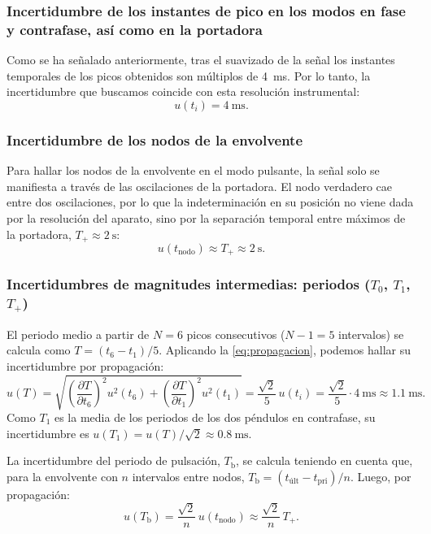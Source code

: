 \documentclass[a4paper,11pt]{amsart}
\numberwithin{equation}{section}
\newcommand{\Tb}{T_{\mathrm{b}}}              %
\newcommand{\Tp}{T_{+}}                       %
\theoremstyle{cienplano}
\theoremstyle{ciendef}
\theoremstyle{cienobs}
\begin{document}
\subsubsection{Incertidumbre de los instantes de pico en los modos en fase y contrafase, así como en la portadora}
Como se ha señalado anteriormente, tras el suavizado de la señal los instantes
temporales de los picos obtenidos son múltiplos de \SI{4}{\milli\second}. Por
lo tanto, la incertidumbre que buscamos coincide con esta resolución
instrumental:
\begin{equation}\label{eq:uti}
  u(t_i)=\SI{4}{\milli\second}.
\end{equation}

\subsubsection{Incertidumbre de los nodos de la envolvente}
Para hallar los nodos de la envolvente en el modo pulsante, la señal solo se
manifiesta a través de las oscilaciones de la portadora. El nodo verdadero cae
entre dos oscilaciones, por lo que la indeterminación en su posición no viene
dada por la resolución del aparato, sino por la separación temporal entre
máximos de la portadora, $\Tp\approx\SI{2}{\second}$:
\begin{equation}\label{eq:unodo}
  u(t_{\text{nodo}})\approx\Tp\approx\SI{2}{\second}.
\end{equation}

\subsubsection{Incertidumbres de magnitudes intermedias: periodos ($T_0$, $T_1$, $\Tp$)}
El periodo medio a partir de $N=6$ picos consecutivos ($N-1=5$ intervalos) se
calcula como $T=(t_6-t_1)/5$. Aplicando la \cref{eq:propagacion}, podemos
hallar su incertidumbre por propagación:
\begin{equation}\label{eq:uT}
  u(T)=\sqrt{\left(\frac{\partial T}{\partial t_6}\right)^{\!2}u^{2}(t_6)
            +\left(\frac{\partial T}{\partial t_1}\right)^{\!2}u^{2}(t_1)}
      =\frac{\sqrt{2}}{5}\,u(t_i)
      =\frac{\sqrt{2}}{5}\cdot\SI{4}{\milli\second}
      \approx\SI{1,1}{\milli\second}.
\end{equation}
Como $T_1$ es la media de los periodos de los dos péndulos en contrafase, su
incertidumbre es $u(T_1)=u(T)/\sqrt{2}\approx\SI{0,8}{\milli\second}$.

La incertidumbre del periodo de pulsación, $\Tb$, se calcula teniendo en cuenta
que, para la envolvente con $n$ intervalos entre nodos,
$\Tb=(t_{\text{últ}}-t_{\text{pri}})/n$. Luego, por propagación:
\begin{equation}\label{eq:uTb}
  u(\Tb)=\frac{\sqrt{2}}{n}\,u(t_{\text{nodo}})\approx\frac{\sqrt{2}}{n}\,\Tp .
\end{equation}
\end{document}
